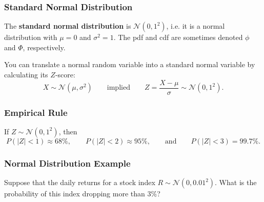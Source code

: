 \documentclass{beamer}
\begin{document}
\begin{frame}
\frametitle{Standard Normal Distribution}
\begin{Definition}
The {\bf standard normal distribution} is $\mathcal{N}(0, 1^2)$, i.e. it is a normal distribution with $\mu = 0$ and $\sigma^2 = 1$. The pdf and cdf are sometimes denoted $\phi$ and $\Phi$, respectively. 
\end{Definition}
You can translate a normal random variable into a standard normal variable by calculating its $Z$-score:
$$
X\sim{\mathcal{N}(\mu, \sigma^2)}\qquad\text{implied}\qquad Z = \frac{X - \mu}{\sigma}\sim{\mathcal{N}(0, 1^2)}.
$$
\end{frame}


\begin{frame}
\frametitle{Empirical Rule}
\small
\begin{center}
\end{center}
If $Z\sim{\mathcal{N}(0, 1^2)}$, then
$$
P(|Z| < 1) \approx 68\%,\qquad P(|Z| < 2) \approx 95\%,\qquad\text{and}\qquad P(|Z| < 3) = 99.7\%.
$$
\end{frame}

\begin{frame}[t]
\frametitle{Normal Distribution Example}
\begin{Example}
Suppose that the daily returns for a stock index $R\sim{\mathcal{N}{(0, 0.01^2)}}$. What is the probability of this index dropping more than 3\%?
\end{Example}

\end{frame}
\end{document}
